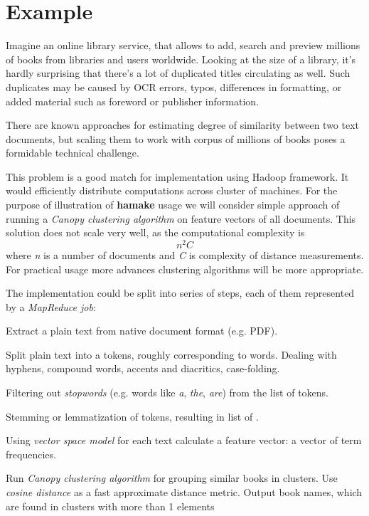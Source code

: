 \documentclass[10pt,conference,letterpaper]{IEEEtran}
\begin{document}
\section{Example}

Imagine an online library service, that allows to add, search and
preview millions of books from libraries and users worldwide. Looking
at the size of a library, it's hardly surprising that there's a lot of
duplicated titles circulating as well. Such duplicates may be caused
by OCR errors, typos, differences in formatting, or added material such as
foreword or publisher information.

There are known approaches for estimating degree of similarity between
two text documents, but scaling them to work with corpus of millions
of books poses a formidable technical challenge.

This problem is a good match for implementation using Hadoop
framework. It would efficiently distribute computations across cluster
of machines. For the purpose of illustration of \textbf{hamake} usage we will
consider simple approach of running a 
\textit{Canopy clustering algorithm}\cite{efficientClustering} on feature
vectors of all documents. This solution does not scale very well, as the
computational complexity is
\begin{equation}\label{clusteringComplexityBigONotation}
n^2C
\end{equation}
where \textit{n} is a number of documents and \textit{C}
is complexity of distance measurements.
For practical usage more advances clustering algorithms
will be more appropriate.

The implementation could be split into series of steps, each of them
represented by a \textit{MapReduce job}:

\begin{description}
\item[\emph{ExtractText}] Extract a plain text from native document format
  (e.g. PDF).
\item[\emph{Tokenize}] Split plain text into a tokens, roughly
  corresponding to words. Dealing with hyphens, compound words,
  accents and diacritics, case-folding. 
\item[\emph{FilterStopwords}] Filtering out \textit{stopwords} (e.g. words
  like \textit{a}, \textit{the}, \textit{are}) from the list of
  tokens.
\item[\emph{Normalize}] Stemming or lemmatization of tokens,
  resulting in list of .
\item[\emph{CalculateTF}] Using \textit{vector space
    model}\cite{manning2008introduction} for each text calculate a
  feature vector: a vector of term frequencies.
\item[\emph{FindSimilar}] Run \textit{Canopy clustering algorithm}
  for grouping similar books in clusters. Use
  \textit{cosine distance} as a fast approximate distance metric. Output
  book names, which are found in clusters with more than 1 elements
\end{description}
\end{document}
